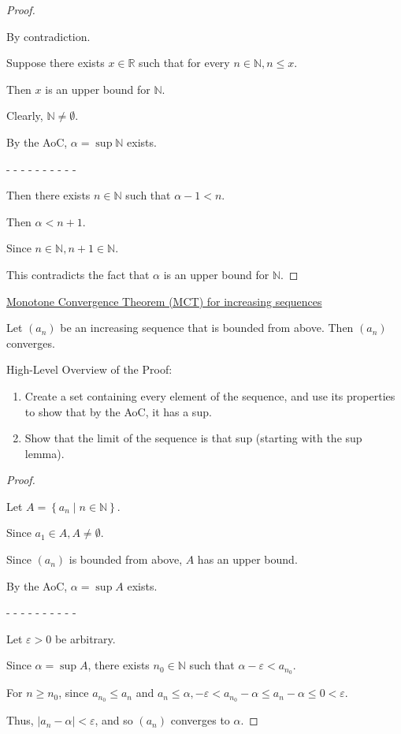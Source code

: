 \documentclass[12pt]{article}
\newcommand{\RR}{\mathbb{R}} %
\newcommand{\NN}{\mathbb{N}}
\newcommand\set[1]{\left\lbrace #1 \right\rbrace} %
\newcommand\abs[1]{\left| #1 \right|} %
\newcommand{\eps}{\varepsilon}
\begin{document}
\dotfill

\begin{proof}
$ $

By contradiction.

Suppose there exists $x \in \RR$ such that for every $n \in \NN, n \le x$.

Then $x$ is an upper bound for $\NN$.

Clearly, $\NN \ne \emptyset$.

By the AoC, $\alpha = \sup \NN$ exists.

- - - - - - - - - -

Then there exists $n \in \NN$ such that $\alpha - 1 < n$.

Then $\alpha < n + 1$.

Since $n \in \NN, n + 1 \in \NN$.

This contradicts the fact that $\alpha$ is an upper bound for $\NN$.
\end{proof}

\pagebreak

\underline{Monotone Convergence Theorem (MCT) for increasing sequences}

Let $(a_n)$ be an increasing sequence that is bounded from above. Then $(a_n)$ converges.

\dotfill

High-Level Overview of the Proof:

\begin{enumerate}
\item Create a set containing every element of the sequence, and use its properties to show that by the AoC, it has a sup.

\item Show that the limit of the sequence is that sup (starting with the sup lemma).
\end{enumerate}

\dotfill

\begin{proof}
$ $

Let $A = \set{a_n \mid n \in \NN}$.

Since $a_1 \in A, A \ne \emptyset$.

Since $(a_n)$ is bounded from above, $A$ has an upper bound.

By the AoC, $\alpha = \sup A$ exists.

- - - - - - - - - -

Let $\eps > 0$ be arbitrary.

Since $\alpha = \sup A$, there exists $n_0 \in \NN$ such that $\alpha - \eps < a_{n_0}$.

For $n \ge n_0$, since $a_{n_0} \le a_n$ and $a_n \le \alpha, -\eps < a_{n_0} - \alpha \le a_n - \alpha \le 0 < \eps$.

Thus, $\abs{a_n - \alpha} < \eps$, and so $(a_n)$ converges to $\alpha$.
\end{proof}
\end{document}
